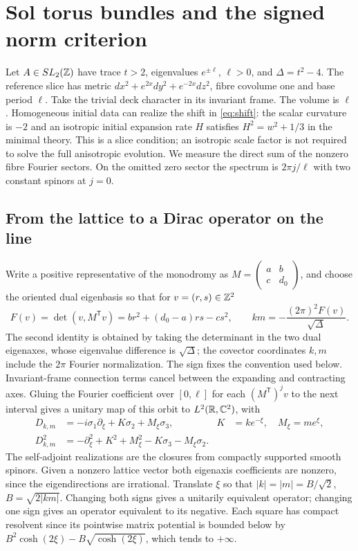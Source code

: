 \section{Sol torus bundles and the signed norm criterion}\label{sec:sol}
Let \(A\in SL_2(\mathbb Z)\) have trace \(t>2\), eigenvalues \(e^{\pm\ell}\), \(\ell>0\), and \(\Delta=t^2-4\). The reference slice has metric \(dx^2+e^{2x}dy^2+e^{-2x}dz^2\), fibre covolume one and base period \(\ell\). Take the trivial deck character in its invariant frame. The volume is \(\ell\). Homogeneous initial data can realize the shift in \eqref{eq:shift}: the scalar curvature is \(-2\) and an isotropic initial expansion rate \(H\) satisfies \(H^2=w^2+1/3\) in the minimal theory. This is a slice condition; an isotropic scale factor is not required to solve the full anisotropic evolution. We measure the direct sum of the nonzero fibre Fourier sectors. On the omitted zero sector the spectrum is \(2\pi j/\ell\) with two constant spinors at \(j=0\).

\subsection{From the lattice to a Dirac operator on the line}
Write a positive representative of the monodromy as \(M=\left(\begin{smallmatrix}a&b\\c&d_0\end{smallmatrix}\right)\), and choose the oriented dual eigenbasis so that for \(v=(r,s)\in\mathbb Z^2\)
\begin{equation}
 F(v)=\det(v,M^\mathsf{T}v)=br^2+(d_0-a)rs-cs^2,\qquad
 km=-\frac{(2\pi)^2 F(v)}{\sqrt{\Delta}} .
 \label{eq:F}
\end{equation}
The second identity is obtained by taking the determinant in the two dual eigenaxes, whose eigenvalue difference is \(\sqrt\Delta\); the covector coordinates \(k,m\) include the \(2\pi\) Fourier normalization. The sign fixes the convention used below. Invariant-frame connection terms cancel between the expanding and contracting axes. Gluing the Fourier coefficient over \([0,\ell]\) for each \((M^\mathsf T)^jv\) to the next interval gives a unitary map of this orbit to \(L^2(\mathbb R,\mathbb C^2)\), with
\begin{align}
 D_{k,m}&=-i\sigma_1\partial_\xi+K\sigma_2+M_\xi\sigma_3,
 &K&=k e^{-\xi},\quad M_\xi=m e^\xi ,\label{eq:line}\\
 D_{k,m}^2&=-\partial_\xi^2+K^2+M_\xi^2-K\sigma_3-M_\xi\sigma_2.
 \label{eq:squared}
\end{align}
The self-adjoint realizations are the closures from compactly supported smooth spinors. Given a nonzero lattice vector both eigenaxis coefficients are nonzero, since the eigendirections are irrational. Translate \(\xi\) so that \(|k|=|m|=B/\sqrt2\), \(B=\sqrt{2|km|}\). Changing both signs gives a unitarily equivalent operator; changing one sign gives an operator equivalent to its negative. Each square has compact resolvent since its pointwise matrix potential is bounded below by \(B^2\cosh(2\xi)-B\sqrt{\cosh(2\xi)}\), which tends to \(+\infty\).

